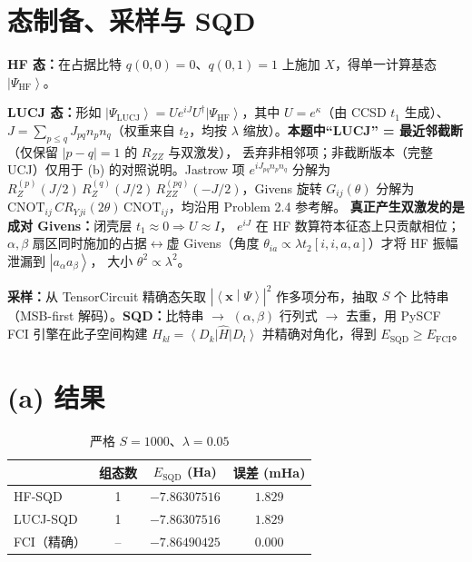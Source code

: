 \documentclass[11pt,a4paper]{article}
\newcommand{\ket}[1]{\left|#1\right\rangle}
\newcommand{\bra}[1]{\left\langle#1\right|}
\newcommand{\braket}[2]{\left\langle#1\middle|#2\right\rangle}
\newcommand{\HF}{\text{HF}}
\newcommand{\Ry}{R_{ZZ}}
\begin{document}
\section{态制备、采样与 SQD}
\textbf{HF 态：}在占据比特 $q(0,0)=0$、$q(0,1)=1$ 上施加 $X$，得单一计算基态 $\ket{\Psi_{\HF}}$。

\textbf{LUCJ 态：}形如 $\ket{\Psi_{\text{LUCJ}}}=U e^{iJ}U^\dagger\ket{\Psi_{\HF}}$，其中
$U=e^\kappa$（由 CCSD $t_1$ 生成）、$J=\sum_{p\le q}J_{pq}n_p n_q$（权重来自 $t_2$，均按
$\lambda$ 缩放）。\textbf{本题中“LUCJ” = 最近邻截断}（仅保留 $|p-q|=1$ 的 $R_{ZZ}$ 与双激发），
丢弃非相邻项；非截断版本（完整 UCJ）仅用于 (b) 的对照说明。Jastrow 项 $e^{iJ_{pq}n_p n_q}$ 分解为
$R_Z^{(p)}(J/2)\,R_Z^{(q)}(J/2)\,\Ry^{(pq)}(-J/2)$，Givens 旋转 $G_{ij}(\theta)$ 分解为
$\text{CNOT}_{ij}\,CR_Y{}_{ji}(2\theta)\,\text{CNOT}_{ij}$，均沿用 Problem 2.4 参考解。
\textbf{真正产生双激发的是成对 Givens：}闭壳层 $t_1\!\approx\!0\Rightarrow U\!\approx\!I$，
$e^{iJ}$ 在 HF 数算符本征态上只贡献相位；$\alpha,\beta$ 扇区同时施加的占据$\leftrightarrow$虚
Givens（角度 $\theta_{ia}\!\propto\!\lambda t_2[i,i,a,a]$）才将 HF 振幅泄漏到 $\ket{a_\alpha a_\beta}$，
大小 $\theta^2\propto\lambda^2$。

\textbf{采样：}从 TensorCircuit 精确态矢取 $|\braket{\bm{x}}{\Psi}|^2$ 作多项分布，抽取 $S$ 个
比特串（MSB-first 解码）。\textbf{SQD：}比特串 $\to$ $(\alpha,\beta)$ 行列式 $\to$ 去重，用
PySCF FCI 引擎在此子空间构建 $H_{kl}=\bra{D_k}\hat H\ket{D_l}$ 并精确对角化，得到
$E_{\text{SQD}}\ge E_{\text{FCI}}$。

\section{(a) 结果}

\begin{table}[h]
\centering
\caption{严格 $S=1000$、$\lambda=0.05$}
\vspace{2pt}
\begin{tabular}{lccc}\toprule
 & 组态数 & $E_{\text{SQD}}$ (Ha) & 误差 (mHa)\\\midrule
HF-SQD        & 1 & $-7.86307516$ & $1.829$\\
LUCJ-SQD      & 1 & $-7.86307516$ & $1.829$\\
FCI（精确）    & --& $-7.86490425$ & $0.000$\\\bottomrule
\end{tabular}
\end{table}
\end{document}
